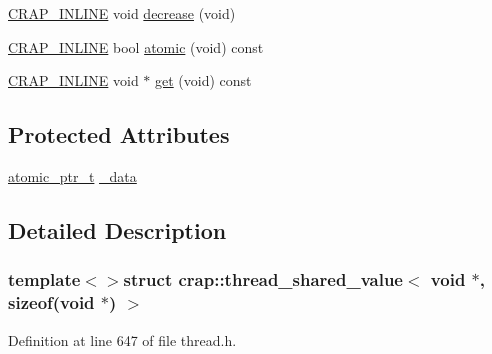 \begin{DoxyCompactItemize}
\hyperlink{config__x86_8h_a5a40526b8d842e7ff731509998bb0f1c}{C\+R\+A\+P\+\_\+\+I\+N\+L\+I\+N\+E} void \hyperlink{structcrap_1_1thread__shared__value_3_01void_01_5_00_01sizeof_07void_01_5_08_01_4_a8aa5d4a7b1aab601da7fdeeb15693978}{decrease} (void)
\item 
\hyperlink{config__x86_8h_a5a40526b8d842e7ff731509998bb0f1c}{C\+R\+A\+P\+\_\+\+I\+N\+L\+I\+N\+E} bool \hyperlink{structcrap_1_1thread__shared__value_3_01void_01_5_00_01sizeof_07void_01_5_08_01_4_a9bd4ccdf01fd8d11ac5622abd9424360}{atomic} (void) const 
\item 
\hyperlink{config__x86_8h_a5a40526b8d842e7ff731509998bb0f1c}{C\+R\+A\+P\+\_\+\+I\+N\+L\+I\+N\+E} void $\ast$ \hyperlink{structcrap_1_1thread__shared__value_3_01void_01_5_00_01sizeof_07void_01_5_08_01_4_a20b539579d4187206377b660e65f0a9b}{get} (void) const 
\end{DoxyCompactItemize}
\subsection*{Protected Attributes}
\begin{DoxyCompactItemize}
\item 
\hyperlink{structcrap_1_1atomic__ptr__t}{atomic\+\_\+ptr\+\_\+t} \hyperlink{structcrap_1_1thread__shared__value_3_01void_01_5_00_01sizeof_07void_01_5_08_01_4_aae2f923c7db4d5a8c7d8a6fdb46d4156}{\+\_\+data}
\end{DoxyCompactItemize}


\subsection{Detailed Description}
\subsubsection*{template$<$$>$struct crap\+::thread\+\_\+shared\+\_\+value$<$ void $\ast$, sizeof(void $\ast$) $>$}



Definition at line 647 of file thread.\+h.



